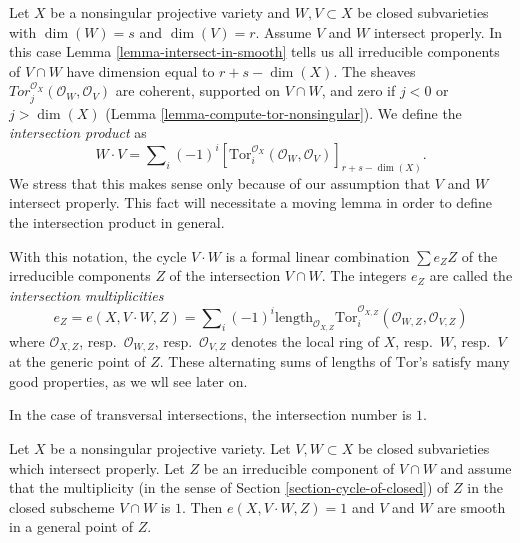 \noindent
Let $X$ be a nonsingular projective variety and $W, V \subset X$
be closed subvarieties with $\dim(W) = s$ and $\dim(V) = r$.
Assume $V$ and $W$ intersect properly.
In this case Lemma \ref{lemma-intersect-in-smooth} tells us all irreducible
components of $V \cap W$ have dimension equal to $r + s - \dim(X)$.
The sheaves $Tor_j^{\mathcal{O}_X}(\mathcal{O}_W, \mathcal{O}_V)$ are
coherent, supported on $V \cap W$, and zero if $j < 0$ or $j > \dim(X)$
(Lemma \ref{lemma-compute-tor-nonsingular}).
We define the {\it intersection product} as
$$
W \cdot V = \sum\nolimits_i (-1)^i
[\text{Tor}_i^{\mathcal{O}_X}(\mathcal{O}_W, \mathcal{O}_V)]_{r + s - \dim(X)}.
$$
We stress that this makes sense only because of our assumption that
$V$ and $W$ intersect properly. This fact will necessitate a moving
lemma in order to define the intersection product in general.

\medskip\noindent
With this notation, the cycle $V \cdot W$ is a formal linear
combination $\sum e_Z Z$ of the irreducible components $Z$
of the intersection $V \cap W$. The integers $e_Z$ are called
the {\it intersection multiplicities}
$$
e_Z = e(X, V \cdot W, Z) =
\sum\nolimits_i
(-1)^i
\text{length}_{\mathcal{O}_{X, Z}}
\text{Tor}_i^{\mathcal{O}_{X, Z}}(\mathcal{O}_{W, Z}, \mathcal{O}_{V, Z})
$$
where $\mathcal{O}_{X, Z}$, resp.\ $\mathcal{O}_{W, Z}$,
resp.\ $\mathcal{O}_{V, Z}$ denotes the local ring of $X$, resp.\ $W$,
resp.\ $V$ at the generic point of $Z$.
These alternating sums of lengths of $\text{Tor}$'s satisfy many good
properties, as we wll see later on.

\medskip\noindent
In the case of transversal intersections, the intersection number is $1$.

\begin{lemma}
\label{lemma-transversal}
Let $X$ be a nonsingular projective variety. Let $V, W \subset X$ be
closed subvarieties which intersect properly. Let $Z$ be an irreducible
component of $V \cap W$ and assume that the multiplicity
(in the sense of Section \ref{section-cycle-of-closed}) of $Z$
in the closed subscheme $V \cap W$ is $1$.
Then $e(X, V \cdot W, Z) = 1$ and $V$ and $W$ are smooth
in a general point of $Z$.
\end{lemma}

